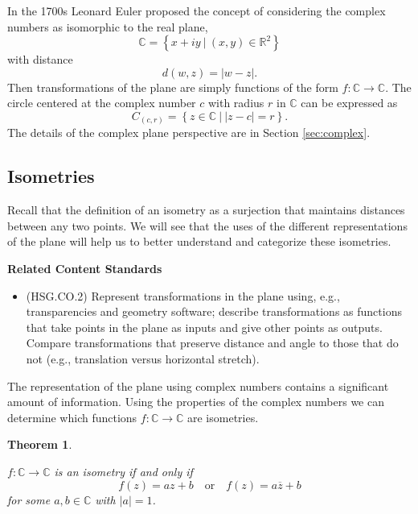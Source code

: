 \documentclass[
]{book}
\providecommand{\tightlist}{%
  \setlength{\itemsep}{0pt}\setlength{\parskip}{0pt}}
\newenvironment{standards}{}{}
\newtheorem{theorem}{Theorem}[chapter]
\theoremstyle{definition}
\theoremstyle{definition}
\theoremstyle{definition}
\theoremstyle{definition}
\theoremstyle{remark}
\begin{document}
In the 1700s Leonard Euler proposed the concept of considering the complex numbers as isomorphic to the real plane, \[\mathbb{C} = \left\{ x+iy \: \vert \: (x,y)\in \mathbb{R}^2\right\}\] with distance \[d(w,z) = |w-z|.\] Then transformations of the plane are simply functions of the form \(f:\mathbb{C} \rightarrow \mathbb{C}\). The circle centered at the complex number \(c\) with radius \(r\) in \(\mathbb{C}\) can be expressed as \[C_{(c,r)} = \left\{ z\in \mathbb{C} \: \vert \: |z-c|=r\right\}.\] The details of the complex plane perspective are in Section \ref{sec:complex}.

\hypertarget{isometries-1}{%
\subsection{Isometries}\label{isometries-1}}

Recall that the definition of an isometry as a surjection that maintains distances between any two points. We will see that the uses of the different representations of the plane will help us to better understand and categorize these isometries.

\begin{standards}

\begin{center}
\textbf{Related Content Standards}

\end{center}

\begin{itemize}
\tightlist
\item
  (HSG.CO.2) Represent transformations in the plane using, e.g., transparencies and geometry software; describe transformations as functions that take points in the plane as inputs and give other points as outputs. Compare transformations that preserve distance and angle to those that do not (e.g., translation versus horizontal stretch).
\end{itemize}

\end{standards}

The representation of the plane using complex numbers contains a significant amount of information. Using the properties of the complex numbers we can determine which functions \(f:\mathbb{C}\rightarrow \mathbb{C}\) are isometries.

\begin{theorem}
\protect\hypertarget{thm:complex-isometry}{}\label{thm:complex-isometry}

\(f:\mathbb{C} \rightarrow \mathbb{C}\) is an isometry if and only if \[f(z)= az+b \quad \mbox{or} \quad f(z)=a \overline{z} +b\] for some \(a,b\in \mathbb{C}\) with \(|a|=1\).

\end{theorem}
\end{document}
